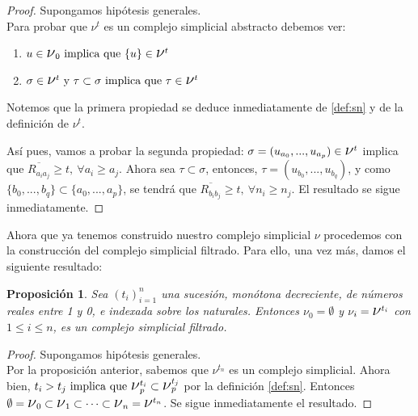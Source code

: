 \documentclass[12pt, a4paper, twoside]{book}
\numberwithin{equation}{section}
\theoremstyle{definition}
\theoremstyle{remark}
\theoremstyle{plain}
\newtheorem{prop}{Proposición}
\begin{document}
	\begin{proof}
		Supongamos hipótesis generales. \\
		Para probar que {\Large $\nu$}$^{t}$ es un complejo simplicial 
		abstracto debemos ver: 
		\begin{enumerate}
			\item $u \in \text{{\Large $\nu$}}_{0} \text{ implica 
				que } \{u\} \in \text{{\Large $\nu$}}^{t}$
			\item $ \sigma \in \text{{\Large $\nu$}}^{t} 
				\text{ y } \tau \subset \sigma \text{ implica 
				que } \tau \in \text{{\Large $\nu$}}^{t}$	
		\end{enumerate}
		Notemos que la primera propiedad se deduce inmediatamente de 
		\ref{def:sn} y de la definición de {\Large $\nu$}$^{t}$.

		Así pues, vamos a probar la segunda propiedad:
		$\sigma=(u_{a_{0}},...,u_{a_{p}}) \in 
		\text{{\Large $\nu$}}^{t}$ 
		 implica que $\overline{R_{a_{i}a_{j}}}\geq t, \  
		\forall a_{i} \geq a_{j}$. 
		Ahora sea $\tau \subset \sigma$, entonces, 
		$\tau = (u_{b_{0}},...,u_{b_{q}})$, y como $\{b_{0},...,
		b_{q}\} 
		\subset \{a_{0},...,a_{p}\}$, se tendrá que 
		$\overline{R_{b_{i}b_{j}}} \geq t,\ \forall n_{i} \geq n_{j}$. 
		El resultado se sigue inmediatamente. 
	\end{proof}

	Ahora que ya tenemos construido nuestro complejo simplicial 
	{\Large $\nu$} procedemos con la construcción del complejo simplicial 
	filtrado. Para ello, una vez más, damos el siguiente resultado:

	\begin{prop}
		Sea $(t_{i})_{i=1}^{n}$ una sucesión, monótona decreciente, 
		de números reales entre 1 y 0, e indexada sobre los naturales. 
		Entonces {\Large $\nu$}$_{0}=\emptyset$ y {\Large $\nu$}$_{i}=
		\text{{\Large $\nu$}}^{t_{i}}$ con $1\leq i \leq n$, es un 
		complejo simplicial filtrado.   
	\end{prop}

	\begin{proof}
		Supongamos hipótesis generales.\\
		Por la proposición anterior, sabemos que 
		{\Large $\nu$}$^{t_{n}}$ es un complejo simplicial. Ahora 
		bien, $t_{i} > t_{j} \text{ implica que } 
		\text{{\Large $\nu$}}_{p}^{t_{i}} \subset 
		\text{{\Large $\nu$}}_{p}^{t_{j}}$ por la definición 
		\ref{def:sn}. Entonces $\emptyset=\text{{\Large $\nu$}}_{0} 
		\subset \text{{\Large $\nu$}}_{1} \subset \cdots \subset 
		\text{{\Large $\nu$}}_{n}=\text{{\Large $\nu$}}^{t_{n}}$. Se 
		sigue inmediatamente el resultado.
	\end{proof}
\end{document}
